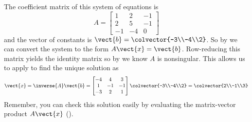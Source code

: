 The coefficient matrix of this system of equations is
%
\begin{equation*}
A=
\begin{bmatrix}
 1 & 2 & -1 \\
 2 & 5 & -1 \\
 -1 & -4 & 0
\end{bmatrix}
\end{equation*}
%
and the vector of constants is $\vect{b}=\colvector{-3\\-4\\2}$.  So by  we can convert the system to the form $A\vect{x}=\vect{b}$.   Row-reducing this matrix yields the identity matrix so by  we know $A$ is nonsingular.  This allows us to apply  to find the unique solution as 
%
\begin{equation*}
\vect{x}
=
\inverse{A}\vect{b}
=
\begin{bmatrix}
 -4 & 4 & 3 \\
 1 & -1 & -1 \\
 -3 & 2 & 1
\end{bmatrix}
\colvector{-3\\-4\\2}
=
\colvector{2\\-1\\3}
%
\end{equation*}
%
Remember, you can check this solution easily by evaluating the matrix-vector product  $A\vect{x}$ ().